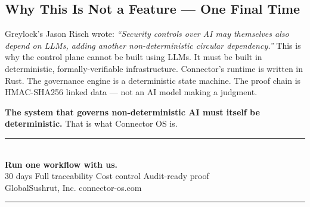 \documentclass[11pt,a4paper]{article}
\begin{document}
\subsection{Why This Is Not a Feature — One Final Time}

Greylock's Jason Risch wrote: \emph{``Security controls over AI may themselves also depend on LLMs,
adding another non-deterministic circular dependency.''} This is why the control plane cannot be
built using LLMs. It must be built in deterministic, formally-verifiable infrastructure.
Connector's runtime is written in Rust. The governance engine is a deterministic state machine.
The proof chain is HMAC-SHA256 linked data — not an AI model making a judgment.

\textbf{The system that governs non-deterministic AI must itself be deterministic.}
That is what Connector OS is.

\vspace{1.2cm}

\begin{center}
\textcolor{CBlue}{\rule{0.5\textwidth}{0.8pt}}\\[10pt]
{\large\bfseries\color{CNavy} Run one workflow with us.}\\[4pt]
{\color{CGray} 30 days \enspace\textbullet\enspace Full traceability
  \enspace\textbullet\enspace Cost control \enspace\textbullet\enspace Audit-ready proof}\\[4pt]
{\normalsize\color{CBlue} GlobalSushrut, Inc. \enspace\textbullet\enspace connector-os.com}
\textcolor{CBlue}{\rule{0.5\textwidth}{0.8pt}}
\end{center}
\end{document}
